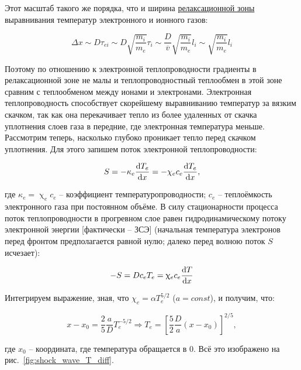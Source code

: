 \documentclass[10pt, a4paper]{article}
\begin{document}
Этот масштаб такого же порядка, что и ширина \uline{релаксационной зоны} выравнивания температур электронного и ионного газов:

\begin{equation*}
	\Delta x \sim D \tau_{ei} \sim D \sqrt{\frac{m_i}{m_e}} \tau_i \sim \frac{D}{\overline{v}} \sqrt{\frac{m_i}{m_e}} l_i \sim \sqrt{\frac{m_i}{m_e}} l_i
\end{equation*}

Поэтому по отношению к электронной теплопроводности градиенты в релаксационной зоне не малы и теплопроводностный теплообмен в этой зоне сравним с теплообменом между ионами и электронами. Электронная теплопроводность способствует скорейшему выравниванию температур за вязким скачком, так как она перекачивает тепло из более удаленных от скачка уплотнения слоев газа в передние, где электронная температура меньше. Рассмотрим теперь, насколько глубоко проникает тепло перед скачком уплотнения. Для этого запишем поток электронной теплопроводности:

\begin{equation*}
	S=-\kappa_e \dv{T_e}{x}=-\chi_e c_e \dv{T_e}{x},
\end{equation*}

где $\kappa_e = \upchi_e c_e$ -- коэффициент температуропроводности; $c_e$ -- теплоёмкость электронного газа при постоянном объёме. В силу стационарности процесса поток теплопроводности в прогревном слое равен гидродинамическому потоку электронной энергии [фактически -- ЗСЭ] (начальная температура электронов перед фронтом предполагается равной нулю; далеко перед волною поток $S$ исчезает):

\begin{equation*}
	-S= D c_e T_e = \upchi_e c_e \dv{T}{x}
\end{equation*}

Интегрируем выражение, зная, что $\chi_e=\alpha T_e^{5/2}$ ($a=const$), и получим, что:

\begin{equation*}
	x-x_0 = \frac{2}{5} \frac{a}{D} T_e^{-5/2} \Rightarrow T_e = \left[\frac{5}{2} \frac{D}{a} (x-x_0) \right]^{2/5},
\end{equation*}

где $x_0$ -- координата, где температура обращается в 0. Всё это изображено на рис.~\ref{fig:shock_wave_T_diff}.
\end{document}
